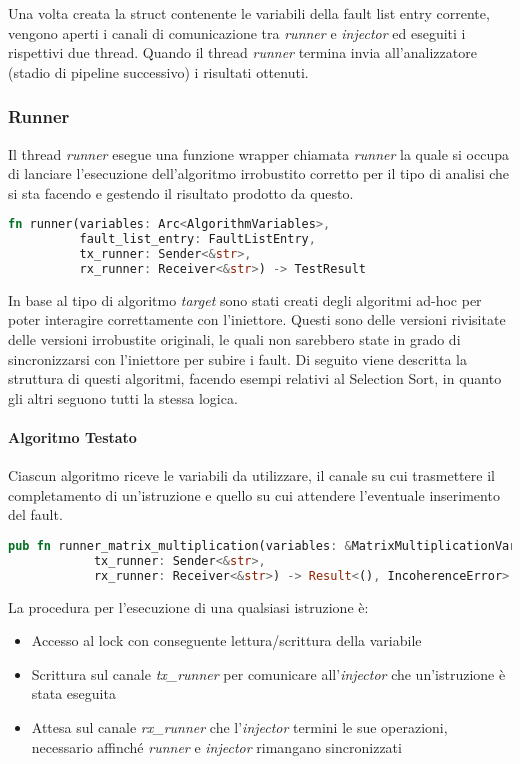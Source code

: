 Una volta creata la struct contenente le variabili della fault list entry corrente, vengono aperti i canali di comunicazione tra \textit{runner} e \textit{injector} ed eseguiti i rispettivi due thread. Quando il thread \textit{runner} termina invia all'analizzatore (stadio di pipeline successivo) i risultati ottenuti.

\subsubsection{Runner}
Il thread \textit{runner} esegue una funzione wrapper chiamata \textit{runner} la quale si occupa di lanciare l'esecuzione dell'algoritmo irrobustito corretto per il tipo di analisi che si sta facendo e gestendo il risultato prodotto da questo. 

\begin{lstlisting}[language=Rust, style=boxed]
fn runner(variables: Arc<AlgorithmVariables>,
          fault_list_entry: FaultListEntry,
          tx_runner: Sender<&str>,
          rx_runner: Receiver<&str>) -> TestResult
\end{lstlisting}

In base al tipo di algoritmo \textit{target} sono stati creati degli algoritmi ad-hoc per poter interagire correttamente con l'iniettore. Questi sono delle versioni rivisitate delle versioni irrobustite originali, le quali non sarebbero state in grado di sincronizzarsi con l'iniettore per subire i fault. Di seguito viene descritta la struttura di questi algoritmi, facendo esempi relativi al Selection Sort, in quanto gli altri seguono tutti la stessa logica. 

\paragraph{Algoritmo Testato}
Ciascun algoritmo riceve le variabili da utilizzare, il canale su cui trasmettere il completamento di un'istruzione e quello su cui attendere l'eventuale inserimento del fault.

\begin{lstlisting}[language=Rust, style=boxed]
pub fn runner_matrix_multiplication(variables: &MatrixMultiplicationVariables, 
            tx_runner: Sender<&str>, 
            rx_runner: Receiver<&str>) -> Result<(), IncoherenceError>
\end{lstlisting}

La procedura per l'esecuzione di una qualsiasi istruzione è:
\begin{itemize}
    \item Accesso al lock con conseguente lettura/scrittura della variabile
    \item Scrittura sul canale \textit{tx\_runner} per comunicare all'\textit{injector} che un'istruzione è stata eseguita
    \item Attesa sul canale \textit{rx\_runner} che l'\textit{injector} termini le sue operazioni, necessario affinché \textit{runner} e \textit{injector} rimangano sincronizzati
\end{itemize}

